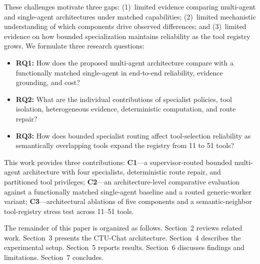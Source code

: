 These challenges motivate three gaps: (1)~limited evidence comparing multi-agent and single-agent architectures under matched capabilities; (2)~limited mechanistic understanding of which components drive observed differences; and (3)~limited evidence on how bounded specialization maintains reliability as the tool registry grows. We formulate three research questions:
\begin{itemize}
    \setlength{\itemsep}{1.5pt}
    \setlength{\parsep}{0pt}
    \setlength{\parskip}{0pt}
    \item \textbf{RQ1:} How does the proposed multi-agent architecture compare with a functionally matched single-agent in end-to-end reliability, evidence grounding, and cost?
    \item \textbf{RQ2:} What are the individual contributions of specialist policies, tool isolation, heterogeneous evidence, deterministic computation, and route repair?
    \item \textbf{RQ3:} How does bounded specialist routing affect tool-selection reliability as semantically overlapping tools expand the registry from 11 to 51 tools?
\end{itemize}

This work provides three contributions:
\textbf{C1}---a supervisor-routed bounded multi-agent architecture with four specialists, deterministic route repair, and partitioned tool privileges;
\textbf{C2}---an architecture-level comparative evaluation against a functionally matched single-agent baseline and a routed generic-worker variant;
\textbf{C3}---architectural ablations of five components and a semantic-neighbor tool-registry stress test across 11--51 tools.

The remainder of this paper is organized as follows. Section~2 reviews related work. Section~3 presents the CTU-Chat architecture. Section~4 describes the experimental setup. Section~5 reports results. Section~6 discusses findings and limitations. Section~7 concludes.
